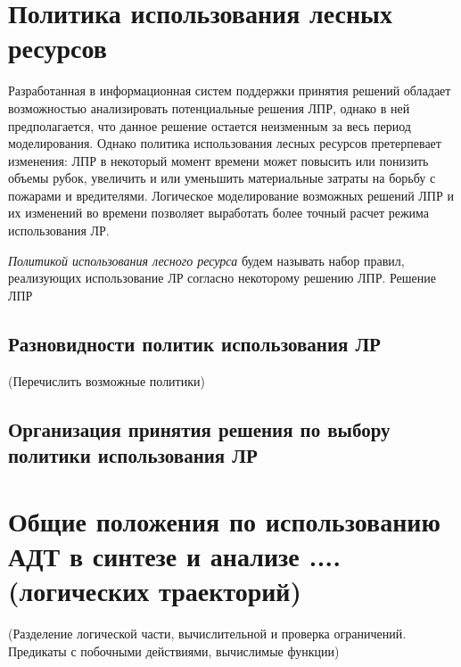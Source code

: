 \section{Политика использования лесных ресурсов}

Разработанная в \cite{dissAsya} информационная систем поддержки принятия решений обладает возможностью анализировать потенциальные решения ЛПР, однако в ней предполагается, что данное решение остается неизменным за весь период моделирования. Однако политика использования лесных ресурсов претерпевает изменения: ЛПР в некоторый момент времени может повысить или понизить объемы рубок, увеличить и или уменьшить материальные затраты на борьбу с пожарами и вредителями. Логическое моделирование возможных решений ЛПР и их изменений во времени позволяет выработать более точный расчет режима использования ЛР.

\emph{Политикой использования лесного ресурса} будем называть набор правил, реализующих использование ЛР согласно некоторому решению ЛПР. Решение ЛПР %

\subsection{Разновидности политик использования ЛР}
(Перечислить возможные политики)

\subsection{Организация принятия решения по выбору политики использования ЛР}

\section{Общие положения по использованию АДТ в синтезе и анализе .... (логических траекторий)}


(Разделение логической части, вычислительной и проверка ограничений. Предикаты с побочными действиями, вычислимые функции)

